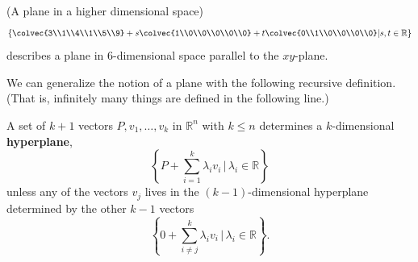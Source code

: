 \begin{example}{(A plane in a higher dimensional space)} \label{2hyperplaneeg}
\[\left\{ \colvec{3\\1\\4\\1\\5\\9} + s\colvec{1\\0\\0\\0\\0\\0} + t\colvec{0\\1\\0\\0\\0\\0} \middle\arrowvert s, t \in \mathbb{R} \right\}\] describes a plane in 6-dimensional space parallel to the $xy$-plane.
\end{example}


\vspace{2mm}
We can generalize the notion of a plane with the following recursive definition. (That is, infinitely many things are defined in the following line.)

\begin{definition} A set of $k+1$ vectors $P,v_1, \ldots, v_k$ in $\mathbb{R}^n$ with $k\leq n$ determines a $k$-dimensional {\bf hyperplane}, 
\[
\left\{ P + \sum_{i=1}^{k} \lambda_iv_i\,  |\,  \lambda_i \in \mathbb{R} \right\}
\]
unless any of the vectors $v_j$ lives in the $(k-1)$-dimensional hyperplane determined by the other $k-1$ vectors
 \[
\left\{ 0 + \sum_{i\neq j}^{k} \lambda_iv_i\,  |\,  \lambda_i \in \mathbb{R} \right\}.
\]
\end{definition}


